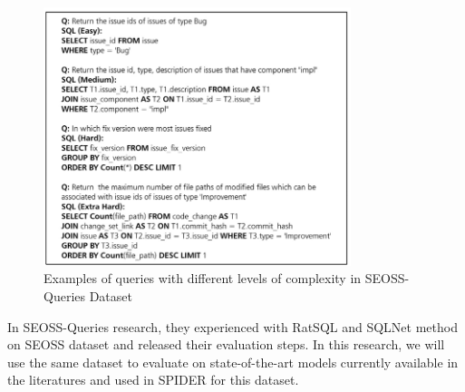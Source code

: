 \begin{figure}[htb]
    \centering
    \includegraphics[width=0.8\textwidth]{pics/seoss/seoss.png}
    \caption{Examples of queries with different levels of complexity in SEOSS-Queries Dataset \cite{TOMOVA2022108211}}
    \label{fig:SESS2}
\end{figure}

In SEOSS-Queries\cite{TOMOVA2022108211} research, they experienced with RatSQL and SQLNet method on SEOSS dataset and released their evaluation steps. In this research, we will use the same dataset to evaluate on state-of-the-art models currently available in the literatures and used in SPIDER for this dataset.

\clearpage
